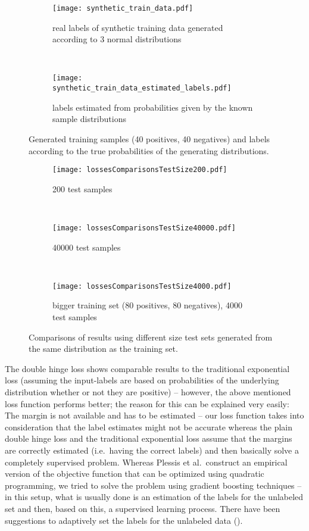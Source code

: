 \begin{figure}[ht]
	\centering
	\begin{subfigure}[h]{0.45\textwidth}
	\texttt{[image: synthetic\_train\_data.pdf]}	
		\caption*{real labels of synthetic training data generated according to 3 normal distributions}
	\end{subfigure}
	~
	\begin{subfigure}[h]{0.45\textwidth}
	\texttt{[image: synthetic\_train\_data\_estimated\_labels.pdf]}	
		\caption*{labels estimated from probabilities given by the known sample distributions}
	\end{subfigure}
	\caption{Generated training samples (40 positives, 40 negatives) and labels according to the true probabilities of the generating distributions.}
	\label{fig:synthetic_train_data}
\end{figure}

\begin{figure}[ht]
	\centering
	\begin{subfigure}[h]{0.45\textwidth}
	\texttt{[image: lossesComparisonsTestSize200.pdf]}	
		\caption*{200 test samples}
	\end{subfigure}
	~
	\begin{subfigure}[h]{0.45\textwidth}
	\texttt{[image: lossesComparisonsTestSize40000.pdf]}	
		\caption*{40000 test samples}
	\end{subfigure}
	~
	\begin{subfigure}[h]{\textwidth}
	\texttt{[image: lossesComparisonsTestSize4000.pdf]}	
		\caption*{bigger training set (80 positives, 80 negatives), 4000 test samples}
	\end{subfigure}
	\caption{Comparisons of results using different size test sets generated from the same distribution as the training set. }
	\label{fig:loss-functions-comparisons}
\end{figure}

The double hinge loss shows comparable results to the traditional exponential loss (assuming the input-labels are based on probabilities of the underlying distribution whether or not they are positive) -- however, the above mentioned loss function performs better; the reason for this can be explained very easily: The margin is not available and has to be estimated -- our loss function takes into consideration that the label estimates might not be accurate whereas the plain double hinge loss and the traditional exponential loss assume that the margins are correctly estimated (i.e.\ having the correct labels) and then basically solve a completely supervised problem. Whereas Plessis et al.\ construct an empirical version of the objective function that can be optimized using quadratic programming, we tried to solve the problem using gradient boosting techniques -- in this setup, what is usually done is an estimation of the labels for the unlabeled set and then, based on this, a supervised learning process. There have been suggestions to adaptively set the labels for the unlabeled data (). 

